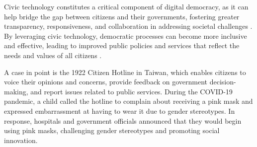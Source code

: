 \documentclass{IEEEtran}
\begin{document}
Civic technology constitutes a critical component of digital democracy, as it can help bridge the gap between citizens and their governments, fostering greater transparency, responsiveness, and collaboration in addressing societal challenges \cite{townsend2013smart}. By leveraging civic technology, democratic processes can become more inclusive and effective, leading to improved public policies and services that reflect the needs and values of all citizens \cite{hollands2015civic}.

A case in point is the 1922 Citizen Hotline in Taiwan, which enables citizens to voice their opinions and concerns, provide feedback on government decision-making, and report issues related to public services. During the COVID-19 pandemic, a child called the hotline to complain about receiving a pink mask and expressed embarrassment at having to wear it due to gender stereotypes. In response, hospitals and government officials announced that they would begin using pink masks, challenging gender stereotypes and promoting social innovation.






\end{document}
